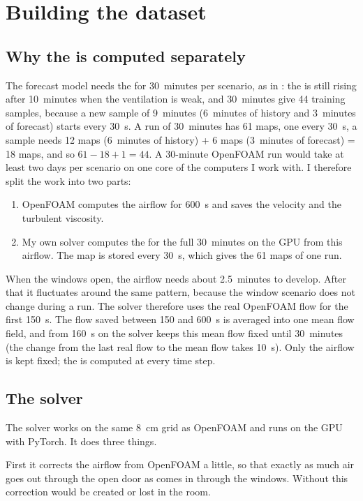 \chapter{Building the \cotwo{} dataset}
\label{ch:dataset}

\section{Why the \cotwo{} is computed separately}
The forecast model needs the \cotwo{} for 30~minutes per scenario, as in \citet{bian2025}: the \cotwo{} is
still rising after 10~minutes when the ventilation is weak, and 30~minutes give 44 training samples,
because a new sample of 9~minutes (6~minutes of history and 3~minutes of forecast) starts every 30~s. A run of
30~minutes has 61 \cotwo{} maps, one every 30~s, a sample needs 12 maps (6~minutes of history) + 6 maps (3~minutes of forecast) = 18 maps, and so $61 - 18 + 1 = 44$.
A 30-minute OpenFOAM run would take at least
two days per scenario on one core of the computers I work with. I therefore split the work into two parts:
\begin{enumerate}
  \item OpenFOAM computes the airflow for 600~s and saves the velocity and the turbulent viscosity.
  \item My own solver computes the \cotwo{} for the full 30~minutes on the GPU from this airflow. The
        \cotwo{} map is stored every 30~s, which gives the 61 maps of one run.
\end{enumerate}
When the windows open, the airflow needs about 2.5~minutes to develop. After that it fluctuates around the
same pattern, because the window scenario does not change during a run. The \cotwo{} solver therefore uses the
real OpenFOAM flow for the first 150~s. The flow saved between 150 and 600~s is averaged into one mean flow
field, and from 160~s on the solver keeps this mean flow fixed until 30~minutes (the change from the last
real flow to the mean flow takes 10~s). Only the airflow is kept fixed; the \cotwo{} is computed at every
time step.

\section{The \cotwo{} solver}
The solver works on the same 8~cm grid as OpenFOAM and runs on the GPU with PyTorch. It does three things.

First it corrects the airflow from OpenFOAM a little, so that exactly as much air goes out through the open
door as comes in through the windows. Without this correction \cotwo{} would be created or lost in the room.

